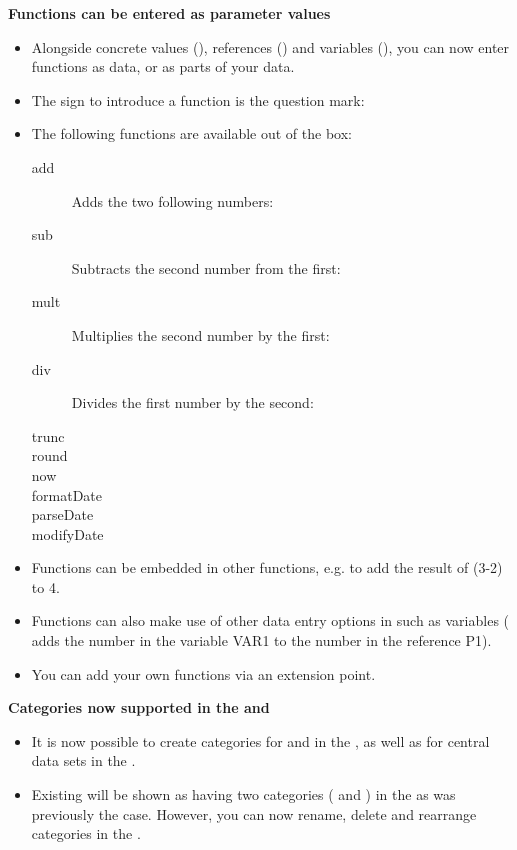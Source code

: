 \textbf{Functions can be entered as parameter values}
\begin{itemize}
\item Alongside concrete values (), references () and variables (), you can now enter functions as data, or as parts of your data.
\item The sign to introduce a function is the question mark: 
\item The following functions are available out of the box:
\begin{description}
\item [add]{Adds the two following numbers: }
\item [sub]{Subtracts the second number from the first: }
\item [mult]{Multiplies the second number by the first: }
\item [div]{Divides the first number by the second: }
\item [trunc]{}
\item [round]{}
\item [now]{}
\item [formatDate]{}
\item [parseDate]{}
\item [modifyDate]{}
\end{description}
\item Functions can be embedded in other functions, e.g.  to add the result of (3-2) to 4. 
\item Functions can also make use of other data entry options in \app{} such as variables ( adds the number in the variable VAR1 to the number in the reference P1). 
\item You can add your own functions via an extension point. 
\end{itemize}

\textbf{Categories now supported in the \gdtestsuitebrowser{} and \gddataeditor}\\
\begin{itemize}
\item It is now possible to create categories for \gdsuites{} and \gdjobs{} in the \gdtestsuitebrowser{}, as well as for central data sets in the \gddataeditor{}. 
\item Existing \gdprojects{} will be shown as having two categories ( and ) in the \gdtestsuitebrowser{} as was previously the case. However, you can now rename, delete and rearrange categories in the \gdtestsuitebrowser{}. 
\end{itemize} 


